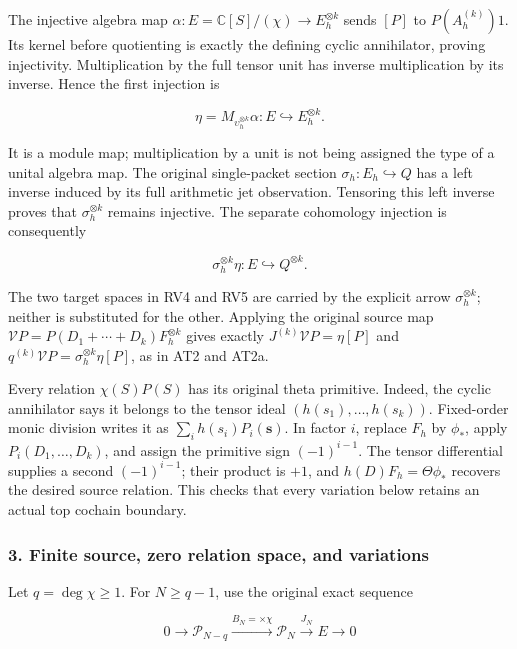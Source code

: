 \documentclass{article}
\begin{document}
The injective algebra map \(\alpha:E=\mathbb C[S]/(\chi)\to E_h^{\otimes k}\) sends \([P]\) to \(P(A_h^{(k)})1\). Its kernel before quotienting is exactly the defining cyclic annihilator, proving injectivity. Multiplication by the full tensor unit has inverse multiplication by its inverse. Hence the first injection is

\[
\eta=M_{\upsilon_h^{\otimes k}}\alpha:
E\hookrightarrow E_h^{\otimes k}.
\tag{RV4}
\]

It is a module map; multiplication by a unit is not being assigned the type of a unital algebra map. The original single-packet section \(\sigma_h:E_h\hookrightarrow Q\) has a left inverse induced by its full arithmetic jet observation. Tensoring this left inverse proves that \(\sigma_h^{\otimes k}\) remains injective. The separate cohomology injection is consequently

\[
\sigma_h^{\otimes k}\eta:E\hookrightarrow Q^{\otimes k}.
\tag{RV5}
\]

The two target spaces in RV4 and RV5 are carried by the explicit arrow \(\sigma_h^{\otimes k}\); neither is substituted for the other. Applying the original source map \(\mathcal VP=P(D_1+\cdots+D_k)F_h^{\otimes k}\) gives exactly \(J^{(k)}\mathcal VP=\eta[P]\) and \(q^{(k)}\mathcal VP=\sigma_h^{\otimes k}\eta[P]\), as in AT2 and AT2a.

Every relation \(\chi(S)P(S)\) has its original theta primitive. Indeed, the cyclic annihilator says it belongs to the tensor ideal \((h(s_1),\ldots,h(s_k))\). Fixed-order monic division writes it as \(\sum_i h(s_i)P_i(\mathbf s)\). In factor \(i\), replace \(F_h\) by \(\phi_*\), apply \(P_i(D_1,\ldots,D_k)\), and assign the primitive sign \((-1)^{i-1}\). The tensor differential supplies a second \((-1)^{i-1}\); their product is \(+1\), and \(h(D)F_h=\Theta\phi_*\) recovers the desired source relation. This checks that every variation below retains an actual top cochain boundary.

\subsubsection{3. Finite source, zero relation space, and variations}\label{endpoint-determinant_review--finite-source-zero-relation-space-and-variations}

Let \(q=\deg\chi\ge1\). For \(N\ge q-1\), use the original exact sequence

\[
0\to\mathcal P_{N-q}\xrightarrow{B_N=\times\chi}\mathcal P_N
\xrightarrow{J_N}E\to0
\tag{RV6}
\]
\end{document}
